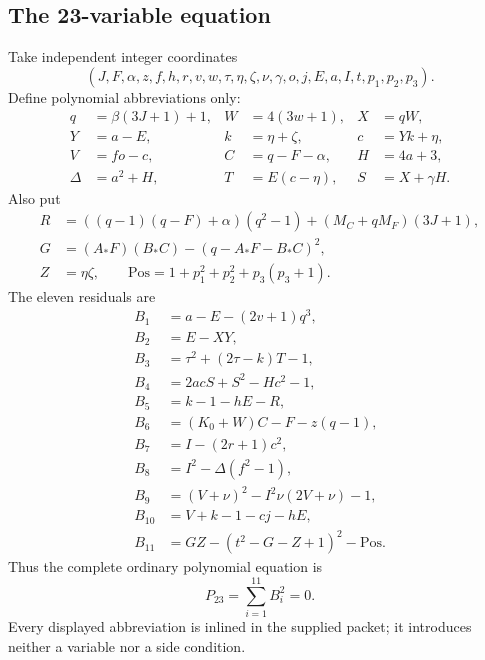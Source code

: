 \subsection{The 23-variable equation}
Take independent integer coordinates
\[
 (J,F,\alpha,z,f,h,r,v,w,\tau,\eta,\zeta,\nu,\gamma,o,j,E,a,I,t,p_1,p_2,p_3).
\]
Define polynomial abbreviations only:
\begin{align*}
 q&=\beta(3J+1)+1,& W&=4(3w+1),& X&=qW,\\
 Y&=a-E,& k&=\eta+\zeta,& c&=Yk+\eta,\\
 V&=fo-c,& C&=q-F-\alpha,& H&=4a+3,\\
 \Delta&=a^2+H,& T&=E(c-\eta),& S&=X+\gamma H.
\end{align*}
Also put
\begin{align*}
 R&=((q-1)(q-F)+\alpha)(q^2-1)+(M_C+qM_F)(3J+1),\\
 G&=(A_*F)(B_*C)-(q-A_*F-B_*C)^2,\\
 Z&=\eta\zeta,\qquad
 \mathrm{Pos}=1+p_1^2+p_2^2+p_3(p_3+1).
\end{align*}
The eleven residuals are
\begin{align*}
 B_1&=a-E-(2v+1)q^3,\\
 B_2&=E-XY,\\
 B_3&=\tau^2+(2\tau-k)T-1,\\
 B_4&=2acS+S^2-Hc^2-1,\\
 B_5&=k-1-hE-R,\\
 B_6&=(K_0+W)C-F-z(q-1),\\
 B_7&=I-(2r+1)c^2,\\
 B_8&=I^2-\Delta(f^2-1),\\
 B_9&=(V+\nu)^2-I^2\nu(2V+\nu)-1,\\
 B_{10}&=V+k-1-cj-hE,\\
 B_{11}&=GZ-(t^2-G-Z+1)^2-\mathrm{Pos}.
\end{align*}
Thus the complete ordinary polynomial equation is
\[
 \boxed{\displaystyle P_{23}=\sum_{i=1}^{11}B_i^2=0.}
\]
Every displayed abbreviation is inlined in the supplied packet; it
introduces neither a variable nor a side condition.

